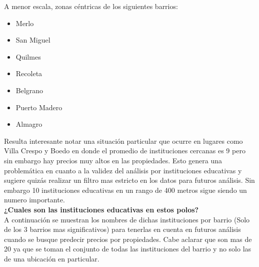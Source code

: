 \documentclass[a4paper, 10pt]{article}
\newcommand\tab[1][0.5cm]{\hspace*{#1}}
\begin{document}
					A menor escala, zonas céntricas de los siguientes barrios:
					\begin{itemize}
					\item Merlo
					\item San Miguel
					\item Quilmes
					\item Recoleta
					\item Belgrano
					\item Puerto Madero
					\item Almagro
					\end{itemize}


					Resulta interesante notar una situación particular que ocurre en lugares como Villa Crespo 
					y Boedo en donde el promedio de instituciones cercanas es 9 pero sin embargo hay precios 
					muy altos en las propiedades. Esto genera una problemática en cuanto a la validez del 
					análisis por instituciones educativas y sugiere quizás realizar un filtro mas estricto 
					en los datos para futuros análisis. Sin embargo 10 instituciones educativas en un 
					rango de 400 metros sigue siendo un numero importante.\\
					
				\textbf{¿Cuales son las instituciones educativas en estos polos?}\\
					\tab A continuación se muestran los nombres de dichas instituciones por barrio
					(Solo de los 3 barrios mas significativos) para tenerlas en cuenta en 
					futuros análisis cuando se busque predecir precios por propiedades. 
					Cabe aclarar que son mas de 20 ya que se toman el conjunto de todas 
					las instituciones del barrio y no solo las de una ubicación en particular.\\
					
\end{document}
